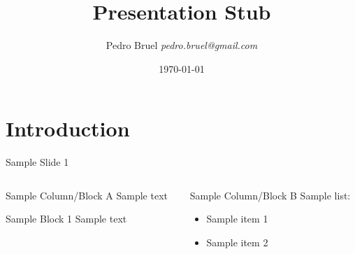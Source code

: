 \documentclass[10pt, compress, aspectratio=169, xcolor={table,usenames,dvipsnames}]{beamer}
\author{\footnotesize Pedro Bruel \newline \scriptsize \emph{pedro.bruel@gmail.com}}
\date{\scriptsize \today}
\title{Presentation Stub}
\begin{document}
\maketitle

\section{Introduction}
\label{sec:org3cf0f55}
\begin{frame}[label={sec:orgbef2c90}]{Sample Slide 1}
\begin{columns}
\begin{column}{0.5\columnwidth}
\begin{block}{Sample Column/Block A}
Sample text

\begin{block}{Sample Block 1}
Sample \alert{text}
\end{block}
\end{block}
\end{column}

\begin{column}{0.5\columnwidth}
\begin{block}{Sample Column/Block B}
Sample list:

\begin{itemize}
\item Sample item 1
\item Sample item 2
\end{itemize}
\end{block}
\end{column}
\end{columns}
\end{frame}
\maketitle
\end{document}
